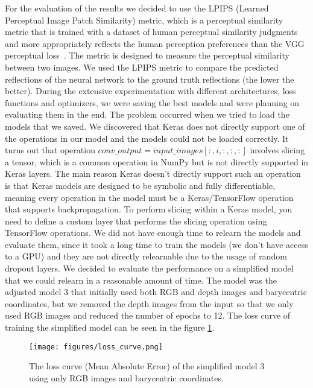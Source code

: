For the evaluation of the results we decided to use the LPIPS (Learned Perceptual Image Patch Similarity) metric, which is a perceptual similarity metric that is trained with a dataset of human perceptual similarity judgments and more appropriately reflects the human
perception preferences than the VGG perceptual loss~\cite{jo2020investigating}. The metric is designed to measure the perceptual similarity between two images.
We used the LPIPS metric to compare the predicted reflections of the neural network to the ground truth reflections (the lower the better).
During the extensive experimentation with different architectures, loss functions and optimizers, we were saving the best models and were planning on evaluating them in the end.
The problem occurred when we tried to load the models that we saved. We discovered that Keras does not directly support one of the operations in our model and the models could not be loaded correctly.
It turns out that operation \(conv\_output = input\_images[:, i, :, :, :]\) involves slicing a tensor, which is a common operation in NumPy but is not directly supported in Keras layers. The main reason Keras doesn't directly support such an operation is that Keras models are designed to be symbolic and fully differentiable, meaning every operation in the model must be a Keras/TensorFlow operation that supports backpropagation.
To perform slicing within a Keras model, you need to define a custom layer that performs the slicing operation using TensorFlow operations.
We did not have enough time to relearn the models and evaluate them, since it took a long time to train the models (we don't have access to a GPU) and they are not directly relearnable due to the usage of random dropout layers.
We decided to evaluate the performance on a simplified model that we could relearn in a reasonable amount of time. The model was the adjusted model 3 that initially used both RGB and depth images and barycentric coordinates, but we removed the depth images from the input so that we only used RGB images and reduced the number of epochs to 12.
The loss curve of training the simplified model can be seen in the figure \ref{fig:loss_curve}.
\begin{figure}[htb]
    \centering
    \texttt{[image: figures/loss\_curve.png]}

    \caption{The loss curve (Mean Absolute Error) of the simplified model 3 using only RGB images and barycentric coordinates.}
    \label{fig:loss_curve}
\end{figure}

